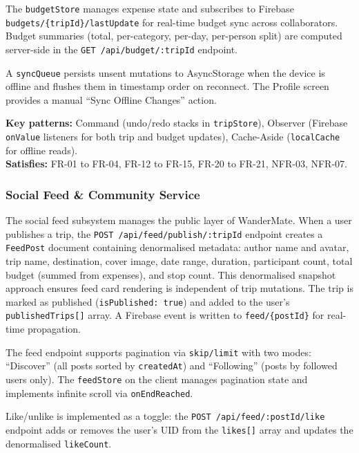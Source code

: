 \documentclass[12pt, a4paper]{article}
\begin{document}
The \texttt{budgetStore} manages expense state and subscribes to Firebase \texttt{budgets/\{tripId\}/lastUpdate} for real-time budget sync across collaborators. Budget summaries (total, per-category, per-day, per-person split) are computed server-side in the \texttt{GET /api/budget/:tripId} endpoint.

A \texttt{syncQueue} persists unsent mutations to AsyncStorage when the device is offline and flushes them in timestamp order on reconnect. The Profile screen provides a manual ``Sync Offline Changes'' action.

\begin{tcolorbox}[notebox]
  \textbf{Key patterns:} Command (undo/redo stacks in \texttt{tripStore}), Observer (Firebase \texttt{onValue} listeners for both trip and budget updates), Cache-Aside (\texttt{localCache} for offline reads).\\[2pt]
  \textbf{Satisfies:} FR-01 to FR-04, FR-12 to FR-15, FR-20 to FR-21, NFR-03, NFR-07.
\end{tcolorbox}

\subsubsection{Social Feed \& Community Service}

The social feed subsystem manages the public layer of WanderMate. When a user publishes a trip, the \texttt{POST /api/feed/publish/:tripId} endpoint creates a \texttt{FeedPost} document containing denormalised metadata: author name and avatar, trip name, destination, cover image, date range, duration, participant count, total budget (summed from expenses), and stop count. This denormalised snapshot approach ensures feed card rendering is independent of trip mutations. The trip is marked as published (\texttt{isPublished: true}) and added to the user's \texttt{publishedTrips[]} array. A Firebase event is written to \texttt{feed/\{postId\}} for real-time propagation.

The feed endpoint supports pagination via \texttt{skip/limit} with two modes: ``Discover'' (all posts sorted by \texttt{createdAt}) and ``Following'' (posts by followed users only). The \texttt{feedStore} on the client manages pagination state and implements infinite scroll via \texttt{onEndReached}.

Like/unlike is implemented as a toggle: the \texttt{POST /api/feed/:postId/like} endpoint adds or removes the user's UID from the \texttt{likes[]} array and updates the denormalised \texttt{likeCount}.
\end{document}
